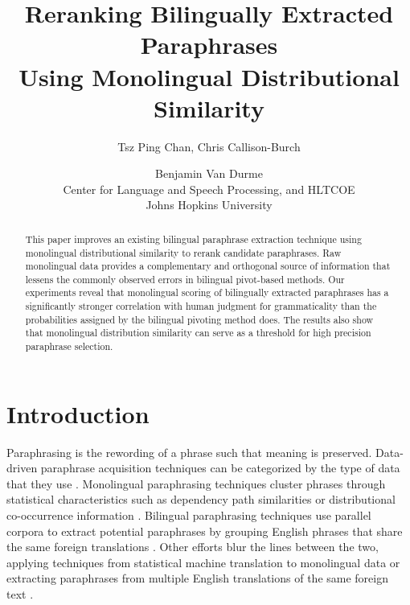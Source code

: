 \documentclass[11pt]{article}
\title{Reranking Bilingually Extracted Paraphrases \\ Using Monolingual Distributional Similarity}
\author{Tsz Ping Chan, Chris Callison-Burch \and Benjamin Van Durme\\
  Center for Language and Speech Processing, and HLTCOE\\
  Johns Hopkins University\\
  }
\date{}
\newcommand{\mnote}[1]{\marginpar{\raggedleft\footnotesize\itshape#1}}
\begin{document}
\maketitle
\begin{abstract}
\vspace{-.2cm}
This paper improves an existing bilingual paraphrase extraction technique using monolingual distributional similarity to rerank candidate paraphrases.  Raw monolingual data provides a complementary and orthogonal source of information that lessens the commonly observed errors in bilingual pivot-based methods. %
Our experiments reveal that monolingual scoring of bilingually extracted paraphrases has a significantly stronger correlation with human judgment for grammaticality than the probabilities assigned by the bilingual pivoting method does. The results also show that monolingual distribution similarity can serve as a threshold for high precision paraphrase selection.


\end{abstract} 


\vspace{-.25cm}
\section{Introduction}
Paraphrasing is the rewording of a phrase such that meaning is preserved. Data-driven paraphrase acquisition techniques can be categorized by the type of data that they use \cite{MadnaniDorr10}.  Monolingual paraphrasing techniques cluster phrases through statistical characteristics such as dependency path similarities or distributional co-occurrence information \cite{Lin01discoveryof,PascaDienes05}.   Bilingual paraphrasing techniques use parallel corpora to extract potential paraphrases by grouping English phrases that share the same foreign translations \cite{BannardCallisonBurch05}.  Other efforts blur the lines between the two, applying techniques from statistical machine translation to monolingual data or extracting paraphrases from multiple English translations of the same foreign text \cite{Barzilay2001,PangEtAl03,QuirkDolanBrockett04}.
\end{document}
